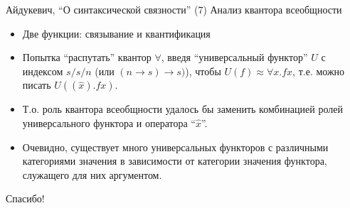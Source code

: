\documentclass{beamer}
\begin{document}
\begin{frame}{Айдукевич, ``О синтаксической связности'' (7)}
Анализ квантора всеобщности\\
\bigskip
\begin{itemize}
  \item Две функции: связывание и квантификация
  \item Попытка ``распутать'' квантор $\forall$, введя ``универсальный функтор'' $U$ с индексом $s/s/n$ (или $(n \to s) \to s)$), чтобы $U(f) \approx \forall x.fx$, т.е. можно писать $U((\hat{x}).fx)$.
  \item Т.о. роль квантора всеобщности удалось бы заменить комбинацией ролей универсального функтора и оператора ``$\hat{x}$''.
  \item Очевидно, существует много универсальных функторов с различными категориями значения в зависимости от категории значения функтора, служащего для них аргументом.
\end{itemize}
\end{frame}


\begin{frame}{}
    \thispagestyle{empty}
    \begin{center}
        {\large Спасибо!}
    \end{center}
\end{frame}


\end{document}
